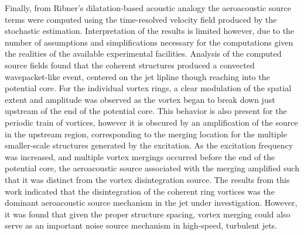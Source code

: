 Finally, from Ribner's dilatation-based acoustic analogy the aeroacoustic source terms were computed using the time-resolved velocity field produced by the stochastic estimation.
Interpretation of the results is limited however, due to the number of assumptions and simplifications necessary for the computations given the realities of the available experimental facilities.
Analysis of the computed source fields found that the coherent structures produced a convected wavepacket-like event, centered on the jet lipline though reaching into the potential core.
For the individual vortex rings, a clear modulation of the spatial extent and amplitude was observed as the vortex began to break down just upstream of the end of the potential core.
This behavior is also present for the periodic train of vortices, however it is obscured by an amplification of the source in the upstream region, corresponding to the merging location for the multiple smaller-scale structures generated by the excitation.
As the excitation frequency was increased, and multiple vortex mergings occurred before the end of the potential core, the aeroacoustic source associated with the merging amplified such that it was distinct from the vortex disintegration source.
The results from this work indicated that the disintegration of the coherent ring vortices was the dominant aeroacoustic source mechanism in the jet under investigation. 
However, it was found that given the proper structure spacing, vortex merging could also serve as an important noise source mechanism in high-speed, turbulent jets. 


